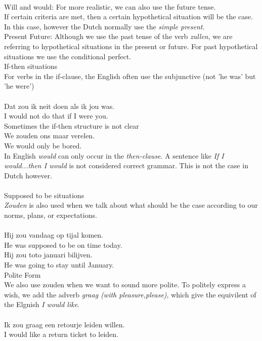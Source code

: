 \documentclass[letterpaper,11pt]{article}
\begin{document}
\\
Will and would: For more realistic, we can also use the future tense. \\
If certain criteria are met, then a certain hypothetical situation will be the
case. In this case, however the Dutch normally use the \textit{simple present}.
\\
Present Future: Although we use the past tense of the verb \textit{zullen}, we
are referring to hypothetical situations in the present or future. For past
hypothetical situations we use the conditional perfect.  \\
If-then situations \\
For verbs in the if-clause, the English often use the subjunctive (not 'he was'
but 'he were') %
\\
 \\
Dat zou ik neit doen als ik jou was. \\
I would not do that if I were you. \\
Sometimes the if-then structure is not clear \\
We zouden ons maar verelen.\\
We would only be bored. \\ %
In English \textit{would} can only occur in the \textit{then-clause}. A sentence
like \textit{If I would...then I would} is not considered correct grammar. This
is not the case in Dutch however. \\ \\
Supposed to be situations \\
\textit{Zouden} is also used when we talk about what should be the case
according to our norms, plans, or expectations. \\
 \\
Hij zou vandaag op tijal komen. \\
He was supposed to be on time today. \\
Hij zou toto januari bilijven. \\
He was going to stay until January. \\
Polite Form \\
We also use zouden when we want to sound more polite. To politely express a
wish, we add the adverb \textit{graag (with pleasure,please)}, which give the
equivilent of the Elgnish \textit{I would like}. \\
 \\
Ik zou graag een retourje leiden willen. \\
I would like a return ticket to leiden. \\
\end{document}
